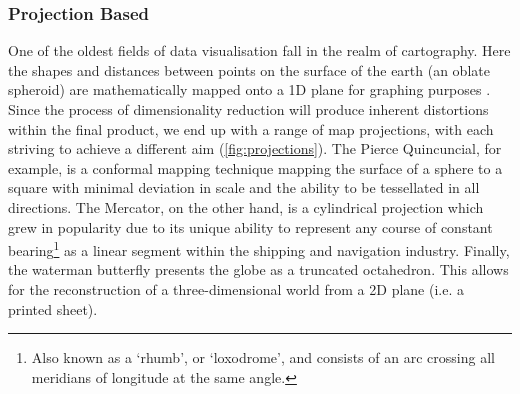 \subsubsection{Projection Based}\label{sec:merc}
One of the oldest fields of data visualisation fall in the realm of cartography. Here the shapes and distances between points on the surface of the earth (an oblate spheroid) are mathematically mapped onto a 1D plane for graphing purposes \citep{projections}. Since the process of dimensionality reduction will produce inherent distortions within the final product, we end up with a range of map projections, with each striving to achieve a different aim (\autoref{fig:projections}). The Pierce Quincuncial, for example, is a conformal mapping technique mapping the surface of a sphere to a square with minimal deviation in scale and the ability to be tessellated in all directions. The Mercator, on the other hand, is a cylindrical projection which grew in popularity due to its unique ability to represent any course of constant bearing\footnote{Also known as a `rhumb', or `loxodrome', and consists of an arc crossing all meridians of longitude at the same angle.} as a linear segment within the shipping and navigation industry.  Finally, the waterman butterfly presents the globe as a truncated octahedron. This allows for the reconstruction of a three-dimensional world from a 2D plane (i.e. a printed sheet). 

